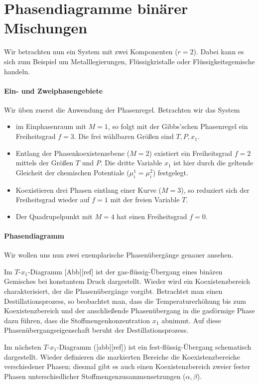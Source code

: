 \section{Phasendiagramme binärer Mischungen}
Wir betrachten nun ein System mit zwei Komponenten ($r=2$). Dabei kann es sich zum Beispiel um Metalllegierungen, Flüssigkristalle oder Flüssigkeitsgemische handeln.
\paragraph*{Ein- und Zweiphasengebiete} Wir üben zuerst die Anwendung der Phasenregel. Betrachten wir das System  
\begin{itemize}
    \item im Einphasenraum mit $M=1$, so folgt mit der Gibbs'schen Phasenregel ein Freiheitsgrad $f=3$. Die frei wählbaren Größen sind $T,P,x_1$. 
    \item Entlang der Phasenkoexistenzebene ($M=2$) existiert ein Freiheitsgrad $f=2$ mittels der Größen $T$ und $P$. Die dritte Variable $x_1$ ist hier durch die geltende Gleicheit der chemischen Potentiale ($\mu_i^1=\mu_i^2$) festgelegt. 
    \item Koexistieren drei Phasen eintlang einer Kurve ($M=3$), so reduziert sich der Freiheitsgrad wieder auf $f=1$ mit der freien Variable $T$.
    \item Der Quadrupelpunkt mit $M=4$ hat einen Freiheitsgrad $f=0$.
\end{itemize}
\paragraph*{Phasendiagramm}
Wir wollen uns nun zwei exemplarische Phasenübergänge genauer ansehen.

Im $T$-$x_1$-Diagramm [Abb][ref] ist der gas-flüssig-Übergang eines binären Gemisches bei konstantem Druck dargestellt. Wieder wird ein Koexistenzbereich charakterisiert, der die Phasenübergänge vorgibt. Betrachtet man einen Destillationsprozess, so beobachtet man, dass die Temperaturerhöhung bis zum Koexistenzbereich und der anschließende Phasenübergang in die gasförmige Phase dazu führen, dass die Stoffmengenkonzentration $x_1$ abnimmt. Auf diese Phasenübergangseigenschaft beruht der Destillationsprozess.

Im nächsten $T$-$x_1$-Diagramm ([abb][ref]) ist ein fest-flüssig-Übergang schematisch dargestellt. Wieder definieren die markierten Bereiche die Koexistenzbereiche verschiedener Phasen; diesmal gibt es auch einen Koexistenzbereich zweier fester Phasen unterschiedlicher Stoffmengenzusammensetzungen ($\alpha, \beta$). 

